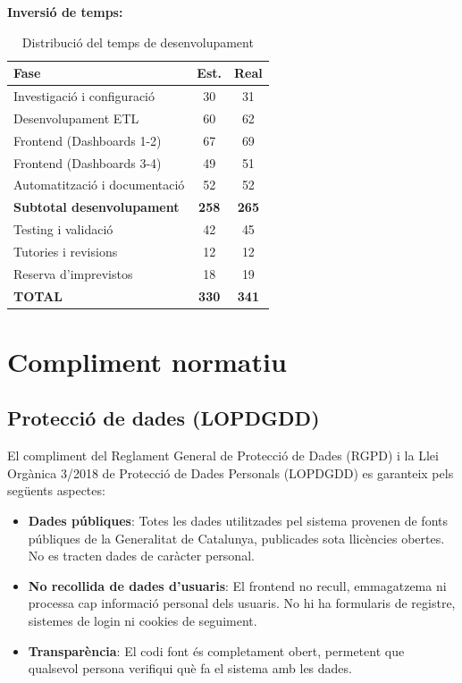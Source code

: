 \textbf{Inversió de temps:}

\begin{table}[h]
\centering
\small
\caption{Distribució del temps de desenvolupament}
\begin{tabular}{|l|c|c|}
\hline
\textbf{Fase} & \textbf{Est.} & \textbf{Real} \\
\hline
Investigació i configuració & 30 & 31 \\
\hline
Desenvolupament ETL & 60 & 62 \\
\hline
Frontend (Dashboards 1-2) & 67 & 69 \\
\hline
Frontend (Dashboards 3-4) & 49 & 51 \\
\hline
Automatització i documentació & 52 & 52 \\
\hline
\textbf{Subtotal desenvolupament} & \textbf{258} & \textbf{265} \\
\hline
Testing i validació & 42 & 45 \\
\hline
Tutories i revisions & 12 & 12 \\
\hline
Reserva d'imprevistos & 18 & 19 \\
\hline
\textbf{TOTAL} & \textbf{330} & \textbf{341} \\
\hline
\end{tabular}
\end{table}


\section{Compliment normatiu}

\subsection{Protecció de dades (LOPDGDD)}

El compliment del Reglament General de Protecció de Dades (RGPD) i la Llei Orgànica 3/2018 de Protecció de Dades Personals (LOPDGDD) es garanteix pels següents aspectes:

\begin{itemize}
    \item \textbf{Dades públiques}: Totes les dades utilitzades pel sistema provenen de fonts públiques de la Generalitat de Catalunya, publicades sota llicències obertes. No es tracten dades de caràcter personal.
    \item \textbf{No recollida de dades d'usuaris}: El frontend no recull, emmagatzema ni processa cap informació personal dels usuaris. No hi ha formularis de registre, sistemes de login ni cookies de seguiment.
    \item \textbf{Transparència}: El codi font és completament obert, permetent que qualsevol persona verifiqui què fa el sistema amb les dades.
\end{itemize}

